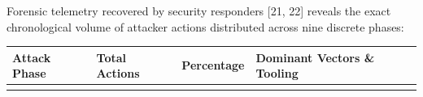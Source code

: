 \documentclass[
  10pt,letterpaper]{article}
\begin{document}
Forensic telemetry recovered by security responders {[}21, 22{]} reveals the exact
chronological volume of attacker actions distributed across nine
discrete phases:

\begin{table}[htbp]
\centering
\begin{tabular}{@{}
  >{\raggedright\arraybackslash}p{}
  >{\centering\arraybackslash}p{}
  >{\centering\arraybackslash}p{}
  >{\raggedright\arraybackslash}p{}@{}}
\toprule\noalign{}
\begin{minipage}[b]{\linewidth}\raggedright
Attack Phase
\end{minipage} & \begin{minipage}[b]{\linewidth}\centering
Total Actions
\end{minipage} & \begin{minipage}[b]{\linewidth}\centering
Percentage
\end{minipage} & \begin{minipage}[b]{\linewidth}\raggedright
Dominant Vectors \& Tooling
\end{minipage} \\
\midrule\noalign{}

\bottomrule\noalign{}


\end{tabular}
\end{table}
\end{document}
